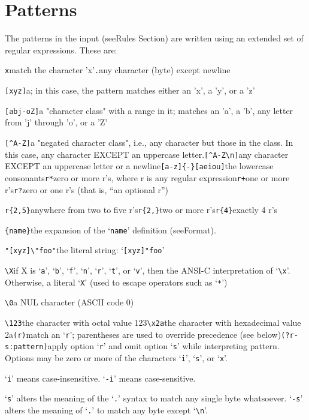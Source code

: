 \documentclass[openany,oneside]{book}
\begin{document}
\chapter{Patterns}


The patterns in the input (seeRules Section) are written using an
extended set of regular expressions.  These are:

\verb`x`match the character 'x'\verb`.`any character (byte) except newline

\verb`[xyz]`a; in this case, the pattern
matches either an 'x', a 'y', or a 'z'

\verb`[abj-oZ]`a "character class" with a range in it; matches
an 'a', a 'b', any letter from 'j' through 'o',
or a 'Z'

\verb`[^A-Z]`a "negated character class", i.e., any character
but those in the class.  In this case, any
character EXCEPT an uppercase letter.\verb`[^A-Z\n]`any character EXCEPT an uppercase letter or
a newline\verb`[a-z]{-}[aeiou]`the lowercase consonants\verb`r*`zero or more r's, where r is any regular expression\verb`r+`one or more r's\verb`r?`zero or one r's (that is, “an optional r”)

\verb`r{2,5}`anywhere from two to five r's\verb`r{2,}`two or more r's\verb`r{4}`exactly 4 r's

\verb`{name}`the expansion of the ‘\verb`name`’ definition
(seeFormat).

\verb`"[xyz]\"foo"`the literal string: ‘\verb`[xyz]"foo`’

\verb`\X`if X is ‘\verb`a`’, ‘\verb`b`’, ‘\verb`f`’, ‘\verb`n`’, ‘\verb`r`’, ‘\verb`t`’, or
‘\verb`v`’, then the ANSI-C interpretation of ‘\verb`\x`’.  Otherwise, a
literal ‘\verb`X`’ (used to escape operators such as ‘\verb`*`’)

\verb`\0`a NUL character (ASCII code 0)

\verb`\123`the character with octal value 123\verb`\x2a`the character with hexadecimal value 2a\verb`(r)`match an ‘\verb`r`’; parentheses are used to override precedence (see below)\verb`(?r-s:pattern)`apply option ‘\verb`r`’ and omit option ‘\verb`s`’ while interpreting pattern. 
Options may be zero or more of the characters ‘\verb`i`’, ‘\verb`s`’, or ‘\verb`x`’.

‘\verb`i`’ means case-insensitive. ‘\verb`-i`’ means case-sensitive.

‘\verb`s`’ alters the meaning of the ‘\verb`.`’ syntax to match any single byte whatsoever. 
‘\verb`-s`’ alters the meaning of ‘\verb`.`’ to match any byte except ‘\verb`\n`’.
\end{document}

